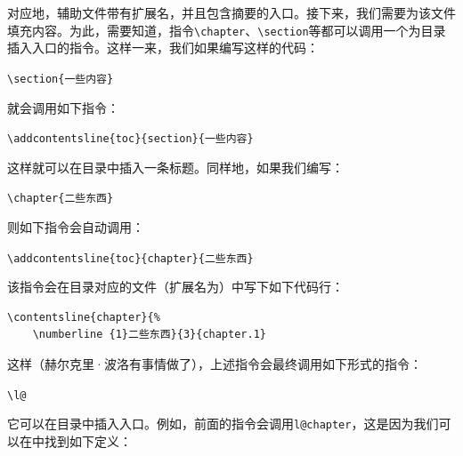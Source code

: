 对应地，辅助文件带有扩展名，并且包含摘要的入口。接下来，我们需要为该文件填充内容。为此，需要知道，指令\verb|\chapter|、\verb|\section|等都可以调用一个为目录插入入口的指令。这样一来，我们如果编写这样的代码：

\begin{dmd}
\verb|\section{一些内容}|
\end{dmd}

就会调用如下指令：

\begin{dmd}
\verb|\addcontentsline{toc}{section}{一些内容}|
\end{dmd}

这样就可以在目录中插入一条标题。同样地，如果我们编写：

\begin{dmd}
\verb+\chapter{二些东西}+
\end{dmd}

则如下指令会自动调用：

\begin{dmd}
\verb|\addcontentsline{toc}{chapter}{二些东西}|
\end{dmd}

该指令会在目录对应的文件（扩展名为）中写下如下代码行：

\begin{dmd}
\begin{verbatim}
\contentsline{chapter}{%
    \numberline {1}二些东西}{3}{chapter.1}\end{verbatim}
\end{dmd}

这样（赫尔克里·波洛有事情做了），上述指令会最终调用如下形式的指令：

\begin{dmd}
\verb+\l@+
\end{dmd}

它可以在目录中插入入口。例如，前面的指令会调用\verb|l@chapter|，这是因为我们可以在中找到如下定义：

